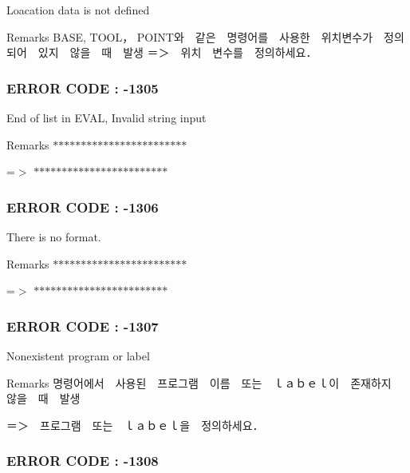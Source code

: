 Loacation data is not defined \begin{DoxyRemark}{Remarks}
B\-A\-S\-E, T\-O\-O\-L， P\-O\-I\-N\-T와　같은　명령어를　사용한　위치변수가　정의되어　있지　않을　때　발생 ＝＞　위치　변수를　정의하세요．
\end{DoxyRemark}


 \subsubsection*{E\-R\-R\-O\-R C\-O\-D\-E \-: -\/1305 }

End of list in E\-V\-A\-L, Invalid string input \begin{DoxyRemark}{Remarks}
$\ast$$\ast$$\ast$$\ast$$\ast$$\ast$$\ast$$\ast$$\ast$$\ast$$\ast$$\ast$$\ast$$\ast$$\ast$$\ast$$\ast$$\ast$$\ast$$\ast$$\ast$$\ast$$\ast$$\ast$ \par
 =$>$ $\ast$$\ast$$\ast$$\ast$$\ast$$\ast$$\ast$$\ast$$\ast$$\ast$$\ast$$\ast$$\ast$$\ast$$\ast$$\ast$$\ast$$\ast$$\ast$$\ast$$\ast$$\ast$$\ast$$\ast$
\end{DoxyRemark}


 \subsubsection*{E\-R\-R\-O\-R C\-O\-D\-E \-: -\/1306 }

There is no format. \begin{DoxyRemark}{Remarks}
$\ast$$\ast$$\ast$$\ast$$\ast$$\ast$$\ast$$\ast$$\ast$$\ast$$\ast$$\ast$$\ast$$\ast$$\ast$$\ast$$\ast$$\ast$$\ast$$\ast$$\ast$$\ast$$\ast$$\ast$ \par
 =$>$ $\ast$$\ast$$\ast$$\ast$$\ast$$\ast$$\ast$$\ast$$\ast$$\ast$$\ast$$\ast$$\ast$$\ast$$\ast$$\ast$$\ast$$\ast$$\ast$$\ast$$\ast$$\ast$$\ast$$\ast$
\end{DoxyRemark}


 \subsubsection*{E\-R\-R\-O\-R C\-O\-D\-E \-: -\/1307 }

Nonexistent program or label \begin{DoxyRemark}{Remarks}
명령어에서　사용된　프로그램　이름　또는　ｌａｂｅｌ이　존재하지　않을　때　발생 \par
 ＝＞　프로그램　또는　ｌａｂｅｌ을　정의하세요．
\end{DoxyRemark}


 \subsubsection*{E\-R\-R\-O\-R C\-O\-D\-E \-: -\/1308 }

